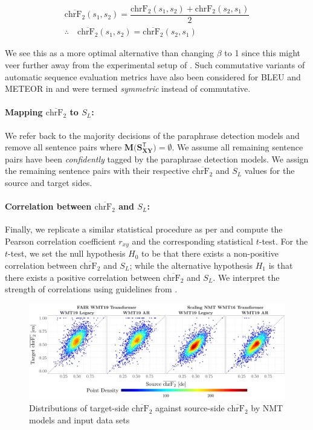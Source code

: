\documentclass[11pt,a4paper]{article}
\begin{document}
\begin{gather}
  \overline{\text{chrF}_2}(s_1,s_2) = \dfrac{\text{chrF}_2(s_1,s_2) + \text{chrF}_2(s_2,s_1)}{2} \\[5pt]
  \therefore \quad \overline{\text{chrF}_2}(s_1,s_2) = \overline{\text{chrF}_2}(s_2,s_1)
\end{gather}

We see this as a more optimal alternative than changing $\beta$ to 1 since this might veer further away from the experimental setup of \citet{michel2019evaluation}. Such commutative variants of automatic sequence evaluation metrics have also been considered for BLEU and METEOR in \citet{wieting-etal-2019-beyond} and were termed \textit{symmetric} instead of commutative.

\paragraph{Mapping $\overline{\text{chrF}_2}$ to $S_L$:}
We refer back to the majority decisions of the paraphrase detection models and remove all sentence pairs where $\mathbf{M(S_{XY}^{\mathsf{T}}}) = \emptyset$. We assume all remaining sentence pairs have been \textit{confidently} tagged by the paraphrase detection models. We assign the remaining sentence pairs with their respective $\overline{\text{chrF}_2}$ and $S_L$ values for the source and target sides. 

\paragraph{Correlation between $\overline{\text{chrF}_2}$ and $S_L$:} Finally, we replicate a similar statistical procedure as per \citet{michel2019evaluation} and compute the Pearson correlation coefficient $r_{xy}$ and the corresponding statistical $t$-test. For the $t$-test, we set the null hypothesis $H_0$ to be that there exists a non-positive correlation between $\overline{\text{chrF}_2}$ and $S_L$; while the alternative hypothesis $H_1$ is that there exists a positive correlation between $\overline{\text{chrF}_2}$ and $S_L$. We interpret the strength of correlations using guidelines from \citet{schober2018correlation}.     

\begin{figure}
  \centering 
  \includegraphics[trim={0cm 0cm 0cm 0cm},clip,width=\textwidth]{chrf_nmt.pdf}
  \caption{Distributions of target-side $\overline{\text{chrF}_2}$ against source-side $\overline{\text{chrF}_2}$ by NMT models and input data sets}
  \label{chrf_distribution}
\end{figure}
\end{document}
